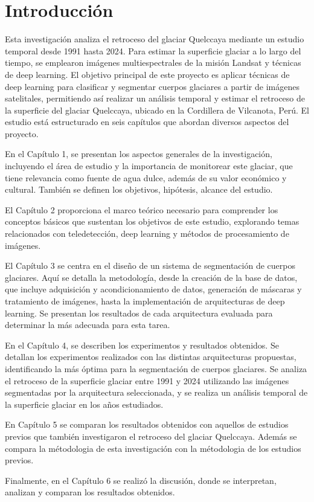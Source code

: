 \chapter*{Introducción}
\doublespacing
Esta investigación analiza el retroceso del glaciar Quelccaya mediante un estudio temporal desde 1991 hasta 2024. Para estimar la superficie glaciar a lo largo del tiempo, se emplearon imágenes multiespectrales de la misión Landsat y técnicas de deep learning. El objetivo principal de este proyecto es aplicar técnicas de deep learning para clasificar y segmentar cuerpos glaciares a partir de imágenes satelitales, permitiendo así realizar un análisis temporal y estimar el retroceso de la superficie del glaciar Quelccaya, ubicado en la Cordillera de Vilcanota, Perú. El estudio está estructurado en seis capítulos que abordan diversos aspectos del proyecto.

En el Capítulo 1, se presentan los aspectos generales de la investigación, incluyendo el área de estudio y la importancia de monitorear este glaciar, que tiene relevancia como fuente de agua dulce, además de su valor económico y cultural. También se definen los objetivos, hipótesis, alcance del estudio.

El Capítulo 2 proporciona el marco teórico necesario para comprender los conceptos básicos que sustentan los objetivos de este estudio, explorando temas relacionados con teledetección, deep learning y métodos de procesamiento de imágenes.

El Capítulo 3 se centra en el diseño de un sistema de segmentación de cuerpos glaciares. Aquí se detalla la metodología, desde la creación de la base de datos, que incluye adquisición y acondicionamiento de datos, generación de máscaras y tratamiento de imágenes, hasta la implementación de arquitecturas de deep learning. Se presentan los resultados de cada arquitectura evaluada para determinar la más adecuada para esta tarea.

En el Capítulo 4, se describen los experimentos y resultados obtenidos. Se detallan los experimentos realizados con las distintas arquitecturas propuestas, identificando la más óptima para la segmentación de cuerpos glaciares. Se analiza el retroceso de la superficie glaciar entre 1991 y 2024 utilizando las imágenes segmentadas por la arquitectura seleccionada, y se realiza un análisis temporal de la superficie glaciar en los años estudiados.

En Capítulo 5 se comparan los resultados obtenidos con aquellos de estudios previos que también investigaron el retroceso del glaciar Quelccaya. Además se compara la métodologia de esta investigación con la métodologia de los estudios previos.

Finalmente, en el Capítulo 6 se realizó la discusión, donde se interpretan, analizan y comparan los resultados obtenidos.


\singlespacing